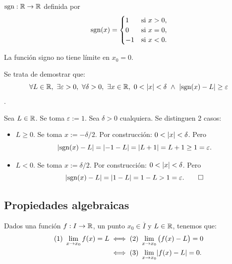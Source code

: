 \documentclass[11pt,a4paper]{article}
\newcommand{\Cl}[1]{\overline{#1}}      %
\begin{document}
\begin{contraejemplo}
$\operatorname{sgn}:\mathbb{R}\to\mathbb{R}$ definida por
\[
  \operatorname{sgn}(x)=\begin{cases} 1 & \text{si } x>0,\\ 0 & \text{si } x=0,\\ -1 & \text{si } x<0.\end{cases}
\]
\begin{center}
\end{center}
\end{contraejemplo}

\begin{proposicion}
La función signo no tiene límite en $x_0=0$.
\end{proposicion}

\begin{demo}
Se trata de demostrar que:
\[
  \forall L\in\R,\ \exists\varepsilon>0,\ \forall\delta>0,\ \exists x\in\R,\ 0<\abs{x}<\delta \ \wedge\ \abs{\sgn(x)-L}\geq\varepsilon
\]
.

Sea $L\in\mathbb{R}$. Se toma $\varepsilon:=1$. Sea $\delta>0$ cualquiera. Se distinguen 2 casos:
\begin{itemize}
  \item $L\geq 0$. Se toma $x:=-\delta/2$. Por construcción: $0<\lvert x\rvert<\delta$. Pero
  \[ \lvert\operatorname{sgn}(x)-L\rvert = \lvert-1-L\rvert = \lvert L+1\rvert = L+1 \geq 1 = \varepsilon. \]
  \item $L<0$. Se toma $x:=\delta/2$. Por construcción: $0<\lvert x\rvert<\delta$. Pero
  \[ \lvert\operatorname{sgn}(x)-L\rvert = \lvert1-L\rvert = 1-L > 1 = \varepsilon. \qedhere \]
\end{itemize}
\end{demo}


\subsection{Propiedades algebraicas}

\begin{observacion}
Dados una función $f:I\to\mathbb{R}$, un punto $x_0\in\Cl{I}$ y $L\in\mathbb{R}$, tenemos que:
\begin{align*}
  \text{(1)}\ \lim_{x\to x_0}f(x)=L
  &\iff \text{(2)}\ \lim_{x\to x_0}\big(f(x)-L\big)=0\\
  &\iff \text{(3)}\ \lim_{x\to x_0}\lvert f(x)-L\rvert=0.
\end{align*}
\end{observacion}
\end{document}
